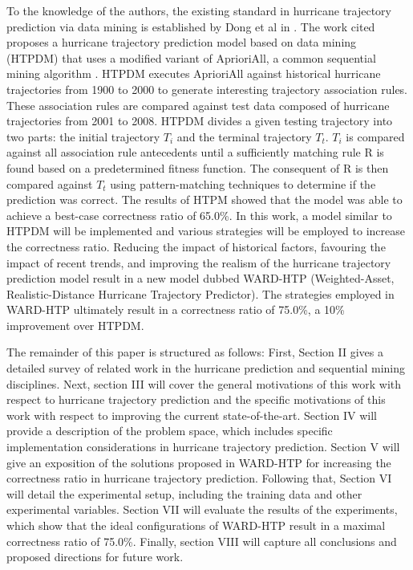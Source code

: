 \documentclass[12pt,conference]{IEEEtran}
\begin{document}
To the knowledge of the authors, the existing standard in hurricane trajectory prediction via data mining is established by Dong et al in \cite{major-hurricane-model}. The work cited proposes a hurricane trajectory prediction model based on data mining (HTPDM) that uses a modified variant of AprioriAll, a common sequential mining algorithm \cite{AprioriAll-original}. HTPDM executes AprioriAll against historical hurricane trajectories from 1900 to 2000 to generate interesting trajectory association rules. These association rules are compared against test data composed of hurricane trajectories from 2001 to 2008. HTPDM divides a given testing trajectory into two parts: the initial trajectory $T_{i}$ and the terminal trajectory $T_{t}$. $T_{i}$ is compared against all association rule antecedents until a sufficiently matching rule R is found based on a predetermined fitness function. The consequent of R is then compared against $T_{t}$ using pattern-matching techniques to determine if the prediction was correct. The results of HTPM showed that the model was able to achieve a best-case correctness ratio of 65.0\%. In this work, a model similar to HTPDM will be implemented and various strategies will be employed to increase the correctness ratio. Reducing the impact of historical factors, favouring the impact of recent trends, and improving the realism of the hurricane trajectory prediction model result in a new model dubbed WARD-HTP (Weighted-Asset, Realistic-Distance Hurricane Trajectory Predictor). The strategies employed in WARD-HTP ultimately result in a correctness ratio of 75.0\%, a 10\% improvement over HTPDM.

The remainder of this paper is structured as follows: First, Section II gives a detailed survey of related work in the hurricane prediction and sequential mining disciplines. Next, section III will cover the general motivations of this work with respect to hurricane trajectory prediction and the specific motivations of this work with respect to improving the current state-of-the-art. Section IV will provide a description of the problem space, which includes specific implementation considerations in hurricane trajectory prediction. Section V will give an exposition of the solutions proposed in WARD-HTP for increasing the correctness ratio in hurricane trajectory prediction. Following that, Section VI will detail the experimental setup, including the training data and other experimental variables. Section VII will evaluate the results of the experiments, which show that the ideal configurations of WARD-HTP result in a maximal correctness ratio of 75.0\%. Finally, section VIII will capture all conclusions and proposed directions for future work.
\end{document}
